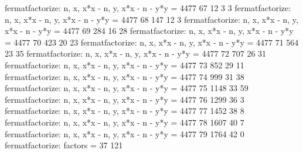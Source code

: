 fermatfactorize: n, x, x*x - n, y, x*x - n - y*y = 4477 67 12 3 3
fermatfactorize: n, x, x*x - n, y, x*x - n - y*y = 4477 68 147 12 3
fermatfactorize: n, x, x*x - n, y, x*x - n - y*y = 4477 69 284 16 28
fermatfactorize: n, x, x*x - n, y, x*x - n - y*y = 4477 70 423 20 23
fermatfactorize: n, x, x*x - n, y, x*x - n - y*y = 4477 71 564 23 35
fermatfactorize: n, x, x*x - n, y, x*x - n - y*y = 4477 72 707 26 31
fermatfactorize: n, x, x*x - n, y, x*x - n - y*y = 4477 73 852 29 11
fermatfactorize: n, x, x*x - n, y, x*x - n - y*y = 4477 74 999 31 38
fermatfactorize: n, x, x*x - n, y, x*x - n - y*y = 4477 75 1148 33 59
fermatfactorize: n, x, x*x - n, y, x*x - n - y*y = 4477 76 1299 36 3
fermatfactorize: n, x, x*x - n, y, x*x - n - y*y = 4477 77 1452 38 8
fermatfactorize: n, x, x*x - n, y, x*x - n - y*y = 4477 78 1607 40 7
fermatfactorize: n, x, x*x - n, y, x*x - n - y*y = 4477 79 1764 42 0
fermatfactorize: factors = 37 121

